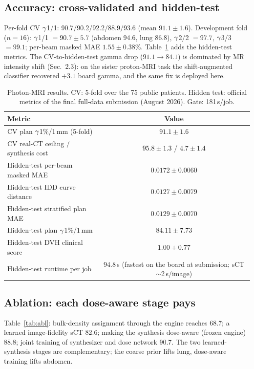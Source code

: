 \documentclass{llncs}
\begin{document}
\subsection{Accuracy: cross-validated and hidden-test}
Per-fold CV $\gamma$1/1: 90.7/90.2/92.2/88.9/93.6 (mean $91.1\pm1.6$). Development fold ($n=16$):
$\gamma$1/1 $=90.7\pm5.7$ (abdomen 94.6, lung 86.8), $\gamma$2/2 $=97.7$, $\gamma$3/3 $=99.1$;
per-beam masked MAE $1.55\pm0.38$\%. Table~\ref{tab:res} adds the hidden-test metrics. The
CV-to-hidden-test gamma drop ($91.1\to84.1$) is dominated by MR intensity shift (Sec.~2.3): on
the sister proton-MRI task the shift-augmented classifier recovered $+3.1$ board gamma, and the
same fix is deployed here.

\begin{table}[t]\centering
\caption{Photon-MRI results. CV: 5-fold over the 75 public patients. Hidden test: official
metrics of the final full-data submission (August 2026). Gate: 181\,s/job.}\label{tab:res}
\begin{tabular}{@{}lc@{}}\toprule
Metric & Value\\\midrule
CV plan $\gamma$1\%/1\,mm (5-fold) & $91.1\pm1.6$\\
CV real-CT ceiling / synthesis cost & $95.8\pm1.3$ / $4.7\pm1.4$\\
Hidden-test per-beam masked MAE & $0.0172\pm0.0060$\\
Hidden-test IDD curve distance & $0.0127\pm0.0079$\\
Hidden-test stratified plan MAE & $0.0129\pm0.0070$\\
Hidden-test plan $\gamma$1\%/1\,mm & $84.11\pm7.73$\\
Hidden-test DVH clinical score & $1.00\pm0.77$\\
Hidden-test runtime per job & 94.8\,s (fastest on the board at submission; sCT $\sim$2\,s/image)\\\bottomrule
\end{tabular}\end{table}

\subsection{Ablation: each dose-aware stage pays}
Table~\ref{tab:abl}: bulk-density assignment through the engine reaches 68.7; a learned
image-fidelity sCT 82.6; making the synthesis dose-aware (frozen engine) 88.8; joint training of
synthesizer and dose network 90.7. The two learned-synthesis stages are complementary; the
coarse prior lifts lung, dose-aware training lifts abdomen.
\end{document}
